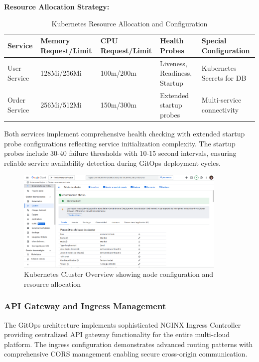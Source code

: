 \textbf{Resource Allocation Strategy:}

\begin{table}[H]
\centering
\caption{Kubernetes Resource Allocation and Configuration}
\label{tab:kubernetes-resource-allocation}
\begin{tabular}{|p{3cm}|p{2.5cm}|p{2.5cm}|p{3cm}|p{3cm}|}
\hline
\textbf{Service} & \textbf{Memory Request/Limit} & \textbf{CPU Request/Limit} & \textbf{Health Probes} & \textbf{Special Configuration} \\
\hline
User Service & 128Mi/256Mi & 100m/200m & Liveness, Readiness, Startup & Kubernetes Secrets for DB \\
\hline
Order Service & 256Mi/512Mi & 150m/300m & Extended startup probes & Multi-service connectivity \\
\hline
\end{tabular}
\end{table}

Both services implement comprehensive health checking with extended startup probe configurations reflecting service initialization complexity. The startup probes include 30-40 failure thresholds with 10-15 second intervals, ensuring reliable service availability detection during GitOps deployment cycles.

\begin{figure}[H]
\centering
\includegraphics[width=0.9\textwidth]{figures/chapter4/kubernetes-cluster-overview.png}
\caption{Kubernetes Cluster Overview showing node configuration and resource allocation}
\label{fig:kubernetes-cluster-overview}
\end{figure}

\subsubsection{API Gateway and Ingress Management}

The GitOps architecture implements sophisticated NGINX Ingress Controller providing centralized API gateway functionality for the entire multi-cloud platform. The ingress configuration demonstrates advanced routing patterns with comprehensive CORS management enabling secure cross-origin communication.

